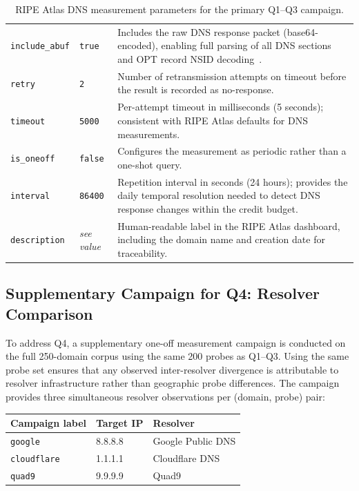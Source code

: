 \begin{table}[H]
\begin{tabularx}{\linewidth}{l l X}
\texttt{include\_abuf} & \texttt{true} & Includes the raw \ac{DNS} response packet (base64-encoded), enabling full parsing of all \ac{DNS} sections and OPT record \ac{NSID} decoding~\cite{RFC5001}. \\
\texttt{retry} & \texttt{2} & Number of retransmission attempts on timeout before the result is recorded as no-response. \\
\texttt{timeout} & \texttt{5000} & Per-attempt timeout in milliseconds (5 seconds); consistent with RIPE Atlas defaults for \ac{DNS} measurements. \\
\texttt{is\_oneoff} & \texttt{false} & Configures the measurement as periodic rather than a one-shot query. \\
\texttt{interval} & \texttt{86400} & Repetition interval in seconds (24 hours); provides the daily temporal resolution needed to detect \ac{DNS} response changes within the credit budget. \\
\texttt{description} & \textit{see value} & Human-readable label in the RIPE Atlas dashboard, including the domain name and creation date for traceability. \\
\bottomrule
\end{tabularx}
\caption{RIPE Atlas DNS measurement parameters for the primary Q1--Q3 campaign.}
\label{tab:msm_params}
\end{table}

\subsection{Supplementary Campaign for Q4: Resolver Comparison}
\label{subsec:3.3.3}

To address Q4, a supplementary one-off measurement campaign is conducted on the full 250-domain corpus using the same 200 probes as Q1--Q3. Using the same probe set ensures that any observed inter-resolver divergence is attributable to resolver infrastructure rather than geographic probe differences. The campaign provides three simultaneous resolver observations per (domain, probe) pair:

\begin{table}[H]
\centering
\small
\begin{tabular}{l l l}
\toprule
\textbf{Campaign label} & \textbf{Target IP} & \textbf{Resolver} \\
\midrule
\texttt{google} & 8.8.8.8 & Google Public \ac{DNS} \\
\texttt{cloudflare} & 1.1.1.1 & Cloudflare \ac{DNS} \\
\texttt{quad9} & 9.9.9.9 & Quad9 \\
\bottomrule
\end{tabular}
\end{table}

